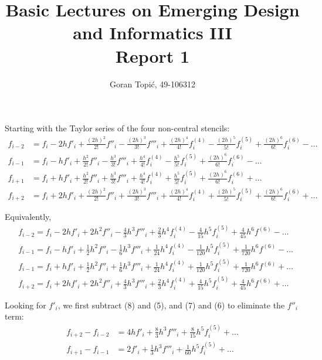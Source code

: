 \documentclass{article}
\begin{document}
\title{Basic Lectures on Emerging Design and Informatics III\\
Report 1}

\author{Goran Topi\'{c}, 49-106312}
\maketitle

Starting with the Taylor series of the four non-central stencils:
\begin{align}
  f_{i-2} &= f_i - 2h f'_i + \frac{(2h)^2}{2!} f''_i - \frac{(2h)^3}{3!} f'''_i + \frac{(2h)^4}{4!} f^{(4)}_i - \frac{(2h)^5}{5!} f^{(5)}_i + \frac{(2h)^6}{6!} f^{(6)}_i - \dots \\
  f_{i-1} &= f_i - h f'_i + \frac{h^2}{2!} f''_i - \frac{h^3}{3!} f'''_i + \frac{h^4}{4!} f^{(4)}_i - \frac{h^5}{5!} f^{(5)}_i + \frac{(2h)^6}{6!} f^{(6)}_i - \dots \\
  f_{i+1} &= f_i + h f'_i + \frac{h^2}{2!} f''_i + \frac{h^3}{3!} f'''_i + \frac{h^4}{4!} f^{(4)}_i + \frac{h^5}{5!} f^{(5)}_i + \frac{(2h)^6}{6!} f^{(6)}_i + \dots \\
  f_{i+2} &= f_i + 2h f'_i + \frac{(2h)^2}{2!} f''_i + \frac{(2h)^3}{3!} f'''_i + \frac{(2h)^4}{4!} f^{(4)}_i + \frac{(2h)^5}{5!} f^{(5)}_i + \frac{(2h)^6}{6!} f^{(6)}_i + \dots
\end{align}

Equivalently,
\begin{align}
  &f_{i-2} = f_i - 2h f'_i + 2h^2 f''_i - \frac{4}{3}h^3 f'''_i + \frac{2}{3}h^4 f^{(4)}_i - \frac{4}{15}h^5 f^{(5)}_i + \frac{4}{45}h^6 f^{(6)} - \dots \\
  &f_{i-1} = f_i - h f'_i + \frac{1}{2}h^2 f''_i - \frac{1}{6}h^3 f'''_i + \frac{1}{24}h^4 f^{(4)}_i - \frac{1}{120}h^5 f^{(5)}_i + \frac{1}{720}h^6 f^{(6)} - \dots \\
  &f_{i-1} = f_i + h f'_i + \frac{1}{2}h^2 f''_i + \frac{1}{6}h^3 f'''_i + \frac{1}{24}h^4 f^{(4)}_i + \frac{1}{120}h^5 f^{(5)}_i + \frac{1}{720}h^6 f^{(6)} + \dots \\
  &f_{i+2} = f_i + 2h f'_i + 2h^2 f''_i + \frac{4}{3}h^3 f'''_i + \frac{2}{3}h^4 f^{(4)}_i + \frac{4}{15}h^5 f^{(5)}_i + \frac{4}{45}h^6 f^{(6)} + \dots
\end{align}

Looking for $f'_i$, we first subtract (8) and (5), and (7) and (6) to eliminate the $f''_i$ term:
\begin{align}
  f_{i+2} - f_{i-2} &= 4hf'_i + \frac{8}{3}h^3 f'''_i + \frac{8}{15}h^5 f^{(5)}_i + \dots \\
  f_{i+1} - f_{i-1} &= 2f'_i + \frac{1}{3}h^3 f'''_i + \frac{1}{60}h^5 f^{(5)}_i + \dots
\end{align}
\end{document}
